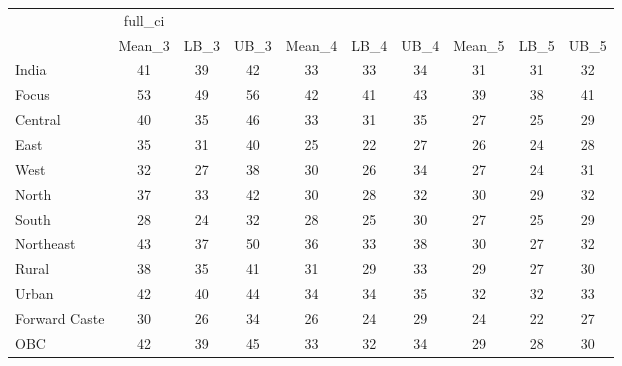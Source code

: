 \begin{tabular}{l*{9}{c}}
\toprule
                    &     full\_ci&            &            &            &            &            &            &            &            \\
                    &      Mean\_3&        LB\_3&        UB\_3&      Mean\_4&        LB\_4&        UB\_4&      Mean\_5&        LB\_5&        UB\_5\\
\midrule
India               &          41&          39&          42&          33&          33&          34&          31&          31&          32\\
Focus               &          53&          49&          56&          42&          41&          43&          39&          38&          41\\
Central             &          40&          35&          46&          33&          31&          35&          27&          25&          29\\
East                &          35&          31&          40&          25&          22&          27&          26&          24&          28\\
West                &          32&          27&          38&          30&          26&          34&          27&          24&          31\\
North               &          37&          33&          42&          30&          28&          32&          30&          29&          32\\
South               &          28&          24&          32&          28&          25&          30&          27&          25&          29\\
Northeast           &          43&          37&          50&          36&          33&          38&          30&          27&          32\\
Rural               &          38&          35&          41&          31&          29&          33&          29&          27&          30\\
Urban               &          42&          40&          44&          34&          34&          35&          32&          32&          33\\
Forward Caste       &          30&          26&          34&          26&          24&          29&          24&          22&          27\\
OBC                 &          42&          39&          45&          33&          32&          34&          29&          28&          30\\

\end{tabular}
